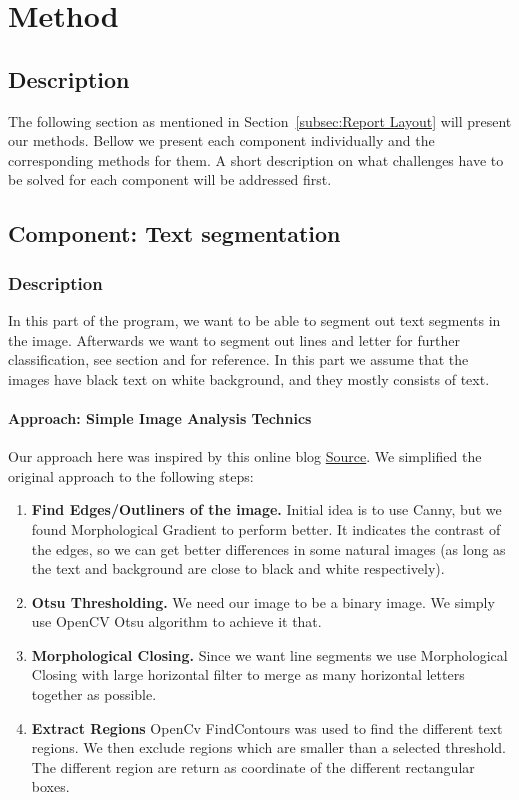 \documentclass[Report.tex]{subfiles}
\begin{document}
\chapter{Method}
\label{chap:Method}
\section{Description}
The following section as mentioned in Section~\ref{subsec:Report Layout} will present our methods. Bellow we present each component individually and the corresponding methods for them. A short description on what challenges have to
be solved for each component will be addressed first.

\section{Component: Text segmentation}
\label{Method:Text_segmentation}

\subsection{Description}
In this part of the program, we want to be able to segment out text segments in the image. Afterwards we want to segment out lines and letter for further classification, see section  and  for reference. In this part we assume that the images have black text on white background, and they mostly consists of text.

\begin{flushleft}
  \subsubsection{Approach: Simple Image Analysis Technics}
  Our approach here was inspired by this online blog \href{https://www.danvk.org/2015/01/07/finding-blocks-of-text-in-an-image-using-python-opencv-and-numpy.html}{Source}\cite{_finding_????}. We simplified the original approach to the following steps:
  \begin{enumerate}
    \item \textbf{Find Edges/Outliners of the image.}
    Initial idea is to use Canny, but we found Morphological Gradient to perform better. It indicates the contrast of the edges, so we can get better differences in some natural images (as long as the text and background are close to black and white respectively).
    \item \textbf{Otsu Thresholding.}
    We need our image to be a binary image. We simply use OpenCV Otsu algorithm to achieve it that.
    \item \textbf{Morphological Closing.}
    Since we want line segments we use Morphological Closing with large horizontal filter to merge as many horizontal letters together as possible.
    \item \textbf{Extract Regions}
    OpenCv FindContours was used to find the different text regions. We then exclude regions which are smaller than a selected threshold. The different region are return as coordinate of the different rectangular boxes.
  \end{enumerate}
\end{flushleft}
\end{document}
